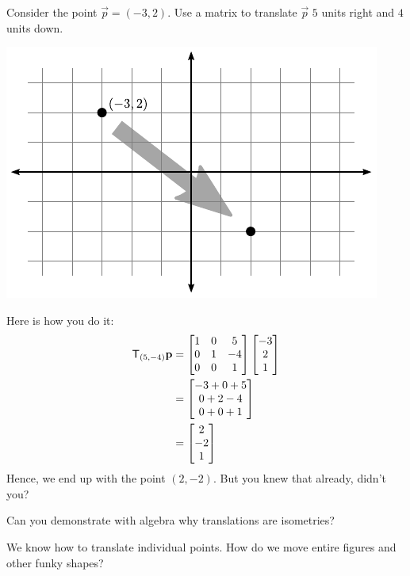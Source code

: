 \documentclass{ximera}
\begin{document}
\begin{example} 
Consider the point $\vec{p} = (-3,2)$. Use a matrix to translate
$\vec{p}$ $5$ units right and $4$ units down.
\begin{image}
\includegraphics{transEg1.pdf}
\end{image}
Here is how you do it:
\begin{align*}
\mathsf{T}_{(5,-4)} \mathbf{p} &= 
\begin{bmatrix}
1 & 0 & 5 \\ 
0 & 1 & -4 \\
0 & 0 & 1
\end{bmatrix}
\begin{bmatrix}
-3 \\
2 \\
1
\end{bmatrix}\\
&=
\begin{bmatrix}
-3 + 0 + 5\\
0 + 2 - 4 \\
0 + 0 + 1
\end{bmatrix}\\
&=
\begin{bmatrix}
2\\
-2 \\
1
\end{bmatrix}
\end{align*}
Hence, we end up with the point $(2,-2)$. But you knew that already,
didn't you?
\end{example}

\begin{question} 
Can you demonstrate with algebra why translations are isometries?
\end{question}



\begin{question} 
We know how to translate individual points. How do we move entire
figures and other funky shapes?
\end{question}
\end{document}
